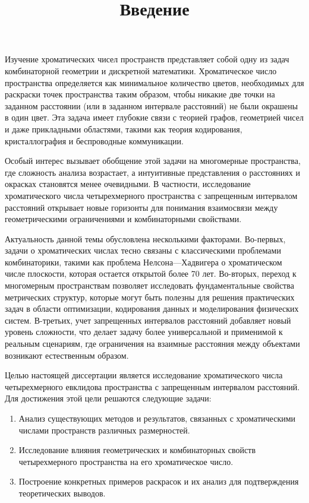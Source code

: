 \documentclass[12pt]{article}
\title{Введение}
\author{}
\date{}
\begin{document}
\maketitle

Изучение хроматических чисел пространств представляет собой одну из задач комбинаторной геометрии и дискретной математики. Хроматическое число пространства определяется как минимальное количество цветов, необходимых для раскраски точек пространства таким образом, чтобы никакие две точки на заданном расстоянии (или в заданном интервале расстояний) не были окрашены в один цвет. Эта задача имеет глубокие связи с теорией графов, геометрией чисел и даже прикладными областями, такими как теория кодирования, кристаллография и беспроводные коммуникации.

Особый интерес вызывает обобщение этой задачи на многомерные пространства, где сложность анализа возрастает, а интуитивные представления о расстояниях и окрасках становятся менее очевидными. В частности, исследование хроматического числа четырехмерного пространства с запрещенным интервалом расстояний открывает новые горизонты для понимания взаимосвязи между геометрическими ограничениями и комбинаторными свойствами.

Актуальность данной темы обусловлена несколькими факторами. Во-первых, задачи о хроматических числах тесно связаны с классическими проблемами комбинаторики, такими как проблема Нелсона—Хадвигера о хроматическом числе плоскости, которая остается открытой более 70 лет. Во-вторых, переход к многомерным пространствам позволяет исследовать фундаментальные свойства метрических структур, которые могут быть полезны для решения практических задач в области оптимизации, кодирования данных и моделирования физических систем. В-третьих, учет запрещенных интервалов расстояний добавляет новый уровень сложности, что делает задачу более универсальной и применимой к реальным сценариям, где ограничения на взаимные расстояния между объектами возникают естественным образом.

Целью настоящей диссертации является исследование хроматического числа четырехмерного евклидова пространства с запрещенным интервалом расстояний. Для достижения этой цели решаются следующие задачи:
\begin{enumerate}
    \item Анализ существующих методов и результатов, связанных с хроматическими числами пространств различных размерностей.
    \item Исследование влияния геометрических и комбинаторных свойств четырехмерного пространства на его хроматическое число.
    \item Построение конкретных примеров раскрасок и их анализ для подтверждения теоретических выводов.
\end{enumerate}
\end{document}
